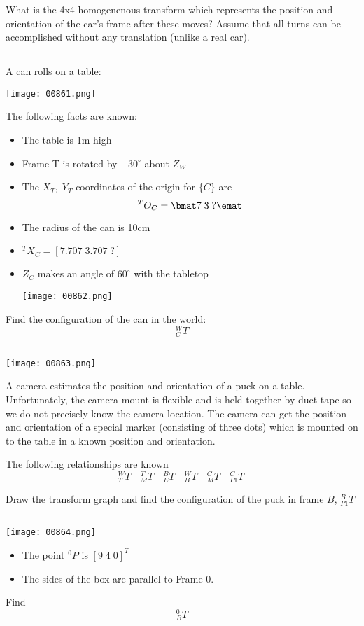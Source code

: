 \documentclass{article}
\begin{document}
What is the 4x4 homogenenous transform which represents the position and orientation of the car's frame after these moves?    Assume that all turns can be accomplished without any translation (unlike a real car).


\subsection{}
A can rolls on a table:

\texttt{[image: 00861.png]}

The following facts are known:

\begin{itemize}
  \item The table is 1m high
  \item Frame T is rotated by $-30^\circ$ about $Z_W$
  \item The $X_T, \; Y_T$ coordinates of the origin for $\{C\}$ are
  \[
  {^TO_C} = \bmat 7\;3\;? \emat
  \]
  \item The radius of the can is 10cm
  \item ${^TX_C} = [7.707\; 3.707\; ?]$
  \item $Z_C$ makes an angle of $60^\circ$ with the tabletop

    \texttt{[image: 00862.png]}

\end{itemize}

Find the configuration of the can in the world:
\[
{^W_CT}
\]


\subsection{}

\texttt{[image: 00863.png]}

A camera estimates the position and orientation of a puck on a table.  Unfortunately, the camera mount is flexible and is held together by duct tape so we do not
precisely know the camera location.  The camera can get the position and orientation of a special marker (consisting of three dots) which is mounted on to the table in a known position and orientation.

The following relationships are known
\[
{^W_TT}\quad { ^T_MT}\quad  {^B_ET}\quad  {^W_BT}\quad  {^C_MT}\quad  {^C_{P1}T}\:
\]

Draw the transform graph and find the configuration of the puck in frame $B$, ${^B_{P1}T}$



\subsection{}

\texttt{[image: 00864.png]}

\begin{itemize}
    \item The point $^0P$ is $[9\; 4\; 0]^T$
    \item The sides of the box are parallel to Frame 0.
\end{itemize}

Find
\[
{^0_BT}
\]
\end{document}

